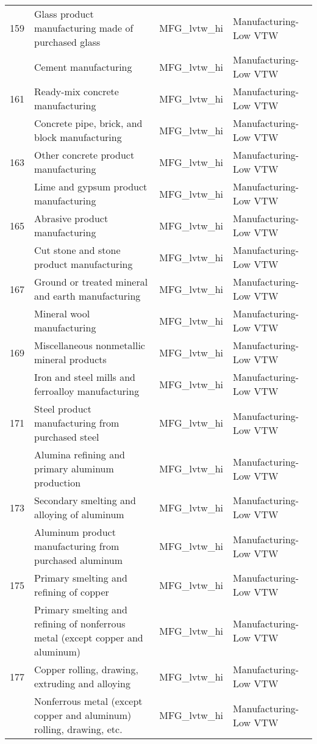 \begin{landscape}
\begin{small}
\begin{longtable}{clll}
159 & Glass product manufacturing made of purchased glass & MFG\_lvtw\_hi & Manufacturing-Low VTW \\
\gray 160 & Cement manufacturing & MFG\_lvtw\_hi & Manufacturing-Low VTW \\
161 & Ready-mix concrete manufacturing & MFG\_lvtw\_hi & Manufacturing-Low VTW \\
\gray 162 & Concrete pipe, brick, and block manufacturing & MFG\_lvtw\_hi & Manufacturing-Low VTW \\
163 & Other concrete product manufacturing & MFG\_lvtw\_hi & Manufacturing-Low VTW \\
\gray 164 & Lime and gypsum product manufacturing & MFG\_lvtw\_hi & Manufacturing-Low VTW \\
165 & Abrasive product manufacturing & MFG\_lvtw\_hi & Manufacturing-Low VTW \\
\gray 166 & Cut stone and stone product manufacturing & MFG\_lvtw\_hi & Manufacturing-Low VTW \\
167 & Ground or treated mineral and earth manufacturing & MFG\_lvtw\_hi & Manufacturing-Low VTW \\
\gray 168 & Mineral wool manufacturing & MFG\_lvtw\_hi & Manufacturing-Low VTW \\
169 & Miscellaneous nonmetallic mineral products & MFG\_lvtw\_hi & Manufacturing-Low VTW \\
\gray 170 & Iron and steel mills and ferroalloy manufacturing & MFG\_lvtw\_hi & Manufacturing-Low VTW \\
171 & Steel product manufacturing from purchased steel & MFG\_lvtw\_hi & Manufacturing-Low VTW \\
\gray 172 & Alumina refining and primary aluminum production & MFG\_lvtw\_hi & Manufacturing-Low VTW \\
173 & Secondary smelting and alloying of aluminum & MFG\_lvtw\_hi & Manufacturing-Low VTW \\
\gray 174 & Aluminum product manufacturing from purchased aluminum & MFG\_lvtw\_hi & Manufacturing-Low VTW \\
175 & Primary smelting and refining of copper & MFG\_lvtw\_hi & Manufacturing-Low VTW \\
\gray 176 & Primary smelting and refining of nonferrous metal (except copper and aluminum) & MFG\_lvtw\_hi & Manufacturing-Low VTW \\
177 & Copper rolling, drawing, extruding and alloying & MFG\_lvtw\_hi & Manufacturing-Low VTW \\
\gray 178 & Nonferrous metal (except copper and aluminum) rolling, drawing, etc. & MFG\_lvtw\_hi & Manufacturing-Low VTW \\

\end{longtable}
\end{small}
\end{landscape}
